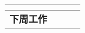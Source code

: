 \documentclass{article}
\begin{document}
\begin{longtable}{|C{2cm}|L{5cm}|C{2cm}|L{5cm}|}
{    }\\
    \hline

    \textbf{下周工作}& \\

\end{longtable}
\end{document}
